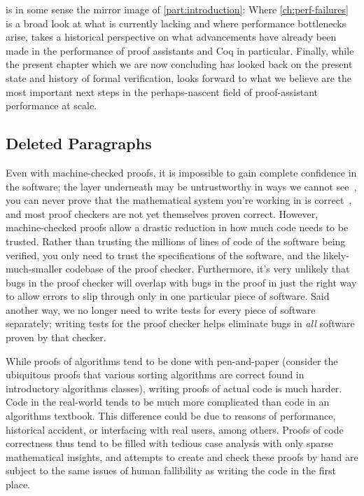  is in some sense the mirror image of \autoref{part:introduction}:
Where \autoref{ch:perf-failures} is a broad look at what is currently lacking and where performance bottlenecks arise,  takes a historical perspective on what advancements have already been made in the performance of proof assistants and Coq in particular.
Finally, while the present chapter which we are now concluding has looked back on the present state and history of formal verification,  looks forward to what we believe are the most important next steps in the perhaps-nascent field of proof-assistant performance at scale.


\begin{subappendices}

\begin{minorcomment}
\section{Deleted Paragraphs}

Even with machine-checked proofs, it is impossible to gain complete confidence in the software; the layer underneath may be untrustworthy in ways we cannot see~\cite{Reflections1984Thompson}, you can never prove that the mathematical system you're working in is correct~\cite{sep-goedel-incompleteness}, and most proof checkers are not yet themselves proven correct.
However, machine-checked proofs allow a drastic reduction in how much code needs to be trusted.
Rather than trusting the millions of lines of code of the software being verified, you only need to trust the specifications of the software, and the likely-much-smaller codebase of the proof checker.
Furthermore, it's very unlikely that bugs in the proof checker will overlap with bugs in the proof in just the right way to allow errors to slip through only in one particular piece of software.
Said another way, we no longer need to write tests for every piece of software separately; writing tests for the proof checker helps eliminate bugs in \emph{all} software proven by that checker.

While proofs of algorithms tend to be done with pen-and-paper (consider the ubiquitous proofs that various sorting algorithms are correct found in introductory algorithms classes), writing proofs of actual code is much harder.
Code in the real-world tends to be much more complicated than code in an algorithms textbook.
This difference could be due to reasons of performance, historical accident, or interfacing with real users, among others.
Proofs of code correctness thus tend to be filled with tedious case analysis with only sparse mathematical insights, and attempts to create and check these proofs by hand are subject to the same issues of human fallibility as writing the code in the first place.


\end{minorcomment}
\end{subappendices}
